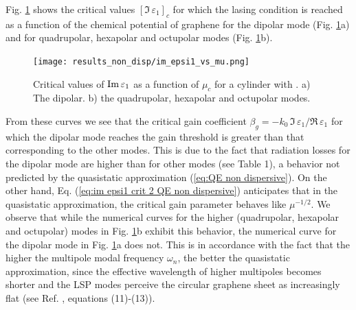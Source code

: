 \documentclass[9pt,twocolumn,twoside]{osajnl}
\begin{document}
Fig. \ref{fig critical values non disp} shows the  critical values  $[\Im\,\varepsilon_{1}]_c$ for which the lasing condition is reached as a function of the chemical potential of graphene for the dipolar mode (Fig. \ref{fig critical values non disp}a) and for quadrupolar, hexapolar and octupolar modes  (Fig. \ref{fig critical values non disp}b).  
%
\begin{figure}[H]
\centering
\texttt{[image: results\_non\_disp/im\_epsi1\_vs\_mu.png]}
\caption{Critical values of ${\rm Im \mit} \,\varepsilon_1$ as a function of $\mu_c$ for 
a cylinder with \twoNonDisp. a) The dipolar. b) the quadrupolar, hexapolar and octupolar modes.}
\label{fig critical values non disp}
\end{figure}
%
From these curves 
we see that the critical gain coefficient $\beta_g=-k_0\, \Im\,\varepsilon_1/\Re\,\varepsilon_1$ for which the dipolar mode reaches the gain threshold is greater than that corresponding to the other modes. 
This is due to the fact that  radiation losses for the dipolar mode are higher than for  other modes (see \cite{CRD} Table 1), a behavior not predicted by the quasistatic approximation (\ref{eq:QE non dispersive}).
%
%
On the other hand, Eq. (\ref{eq:im epsi1 crit 2 QE non dispersive}) anticipates that in the quasistatic approximation, the critical gain parameter behaves like $\mu^{-1/2}$.  We observe that while the numerical curves for the higher (quadrupolar, hexapolar and octupolar) modes in Fig. \ref{fig critical values non disp}b exhibit this behavior, the numerical curve for the dipolar mode in Fig. \ref{fig critical values non disp}a does not.
%
This is in accordance with the fact that the higher the multipole modal frequency $\omega_n$, the better the 
quasistatic approximation, 
since the effective wavelength of higher multipoles becomes shorter and the LSP modes perceive the circular graphene sheet as increasingly flat (see Ref. \cite{CRD}, equations (11)-(13)). 

\end{document}
